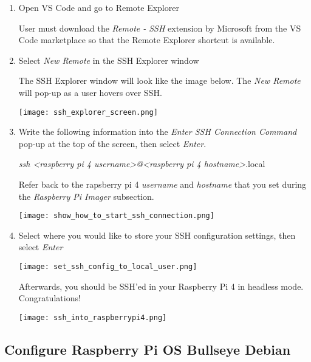 \documentclass[journal]{IEEEtran}
\begin{document}
    \begin{enumerate}
        \item Open VS Code and go to Remote Explorer \newline
        
        User must download the \emph{Remote - SSH} extension by Microsoft from the VS Code marketplace so that the Remote Explorer shortcut is available. \newline

        \item Select \emph{New Remote} in the SSH Explorer window \newline
        
        The SSH Explorer window will look like the image below. The \emph{New Remote} will pop-up as a user hovers over SSH. \newline

        \texttt{[image: ssh\_explorer\_screen.png]}

        \item Write the following information into the \emph{Enter SSH Connection Command} pop-up at the top of the screen, then select \emph{Enter}. \newline
        
        \emph{ssh <raspberry pi 4 username>@<raspberry pi 4 hostname>}.local \newline

        Refer back to the rapsberry pi 4 \emph{username} and \emph{hostname} that you set during the \emph{Raspberry Pi Imager} subsection. \newline

        \texttt{[image: show\_how\_to\_start\_ssh\_connection.png]}

        \item Select where you would like to store your SSH configuration settings, then select \emph{Enter}
        
        \texttt{[image: set\_ssh\_config\_to\_local\_user.png]}

        Afterwards, you should be SSH'ed in your Raspberry Pi 4 in headless mode. Congratulations! \newline
        
        \texttt{[image: ssh\_into\_raspberrypi4.png]}

    \end{enumerate}

    \subsection{Configure Raspberry Pi OS Bullseye Debian}
\end{document}
